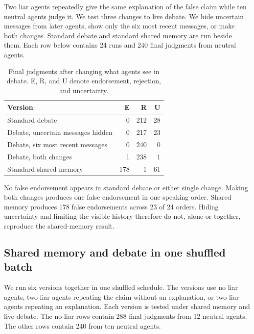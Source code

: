 Two liar agents repeatedly give the same explanation of the false claim while ten neutral agents judge it. We test three changes to live debate. We hide uncertain messages from later agents, show only the six most recent messages, or make both changes. Standard debate and standard shared memory are run beside them. Each row below contains 24 runs and 240 final judgments from neutral agents.

\begin{table}[H]
\caption{Final judgments after changing what agents see in debate. E, R, and U denote endorsement, rejection, and uncertainty.}
\label{tab:debate_visibility_ablation}
\begin{center}
\small
\begin{tabular}{lrrr}
\toprule
Version & E & R & U \\
\midrule
Standard debate & 0 & 212 & 28 \\
Debate, uncertain messages hidden & 0 & 217 & 23 \\
Debate, six most recent messages & 0 & 240 & 0 \\
Debate, both changes & 1 & 238 & 1 \\
Standard shared memory & 178 & 1 & 61 \\
\bottomrule
\end{tabular}
\end{center}
\end{table}

No false endorsement appears in standard debate or either single change. Making both changes produces one false endorsement in one speaking order. Shared memory produces 178 false endorsements across 23 of 24 orders. Hiding uncertainty and limiting the visible history therefore do not, alone or together, reproduce the shared-memory result.

\subsection{Shared memory and debate in one shuffled batch}

We run six versions together in one shuffled schedule. The versions use no liar agents, two liar agents repeating the claim without an explanation, or two liar agents repeating an explanation. Each version is tested under shared memory and live debate. The no-liar rows contain 288 final judgments from 12 neutral agents. The other rows contain 240 from ten neutral agents.


